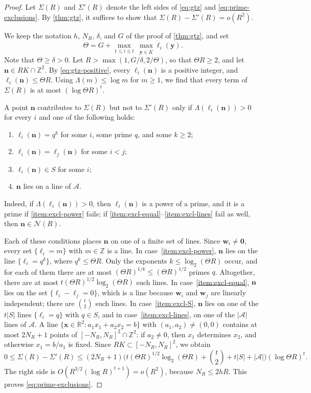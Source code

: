 \documentclass[12pt,oneside,openany]{book}
\theoremstyle{definition}
\theoremstyle{plain}
\numberwithin{equation}{chapter}
\theoremstyle{plain}
\theoremstyle{definition}
\theoremstyle{remark}
\newcommand{\Z}{\mathbb Z}
\newcommand{\R}{\mathbb R}
\begin{document}
\begin{proof}
Let $\Sigma(R)$ and $\Sigma'(R)$ denote the left sides of \eqref{eq:gtz} and \eqref{eq:prime-exclusions}. By \cref{thm:gtz}, it suffices to show that $\Sigma(R)-\Sigma'(R)=o(R^2)$.

We keep the notation $h$, $N_R$, $\delta$, and $G$ of the proof of \cref{thm:gtz}, and set
\[
\Theta=G+\max_{1\le i\le t}\ \max_{\mathbf y\in\overline K}\dot\ell_i(\mathbf y).
\]
Note that $\Theta\ge\delta>0$. Let $R>\max(1,G/\delta,2/\Theta)$, so that $\Theta R\ge2$, and let $\mathbf n\in RK\cap\Z^2$. By \eqref{eq:gtz-positive}, every $\ell_i(\mathbf n)$ is a positive integer, and $\ell_i(\mathbf n)\le\Theta R$. Using $\Lambda(m)\le\log m$ for $m\ge1$, we find that every term of $\Sigma(R)$ is at most $(\log\Theta R)^t$.

A point $\mathbf n$ contributes to $\Sigma(R)$ but not to $\Sigma'(R)$ only if $\Lambda(\ell_i(\mathbf n))>0$ for every $i$ and one of the following holds:
\begin{enumerate}[label=(\roman*)]
\item\label{item:excl-power} $\ell_i(\mathbf n)=q^k$ for some $i$, some prime $q$, and some $k\ge2$;
\item\label{item:excl-equal} $\ell_i(\mathbf n)=\ell_j(\mathbf n)$ for some $i<j$;
\item\label{item:excl-S} $\ell_i(\mathbf n)\in S$ for some $i$;
\item\label{item:excl-lines} $\mathbf n$ lies on a line of $\mathcal A$.
\end{enumerate}
Indeed, if $\Lambda(\ell_i(\mathbf n))>0$, then $\ell_i(\mathbf n)$ is a power of a prime, and it is a prime if \ref{item:excl-power} fails; if \ref{item:excl-equal}--\ref{item:excl-lines} fail as well, then $\mathbf n\in\mathcal N(R)$.

Each of these conditions places $\mathbf n$ on one of a finite set of lines. Since $\mathbf w_i\ne\mathbf 0$, every set $\{\ell_i=m\}$ with $m\in\Z$ is a line. In case~\ref{item:excl-power}, $\mathbf n$ lies on the line $\{\ell_i=q^k\}$, where $q^k\le\Theta R$. Only the exponents $k\le\log_2(\Theta R)$ occur, and for each of them there are at most $(\Theta R)^{1/k}\le(\Theta R)^{1/2}$ primes $q$. Altogether, there are at most $t(\Theta R)^{1/2}\log_2(\Theta R)$ such lines. In case~\ref{item:excl-equal}, $\mathbf n$ lies on the set $\{\ell_i-\ell_j=0\}$, which is a line because $\mathbf w_i$ and $\mathbf w_j$ are linearly independent; there are $\binom t2$ such lines. In case~\ref{item:excl-S}, $\mathbf n$ lies on one of the $t|S|$ lines $\{\ell_i=q\}$ with $q\in S$, and in case~\ref{item:excl-lines}, on one of the $|\mathcal A|$ lines of $\mathcal A$. A line $\{\mathbf x\in\R^2:a_1x_1+a_2x_2=b\}$ with $(a_1,a_2)\ne(0,0)$ contains at most $2N_R+1$ points of $[-N_R,N_R]^2\cap\Z^2$: if $a_2\ne0$, then $x_1$ determines $x_2$, and otherwise $x_1=b/a_1$ is fixed. Since $RK\subset[-N_R,N_R]^2$, we obtain
\[
0\le\Sigma(R)-\Sigma'(R)\le(2N_R+1)\Big(t(\Theta R)^{1/2}\log_2(\Theta R)+\binom t2+t|S|+|\mathcal A|\Big)(\log\Theta R)^t.
\]
The right side is $O(R^{3/2}(\log R)^{t+1})=o(R^2)$, because $N_R\le2hR$. This proves \eqref{eq:prime-exclusions}.


\end{proof}
\end{document}
